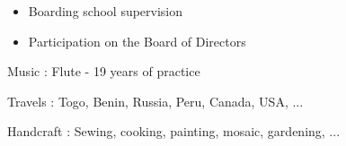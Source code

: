 \begin{itemize}
\item Boarding school supervision
\item Participation on the Board of Directors
\end{itemize}



{\color{emphasis} \faMusic \hspace{0.1cm}  Music : } 
    Flute - 19 years of practice\\
  \vspace{0.25cm}

{\color{emphasis} \faGlobe \hspace{0.1cm} Travels : }  
    Togo, Benin, Russia, Peru, Canada, USA, ...\\
  \vspace{0.25cm}
  
{\color{emphasis} \faCut  \hspace{0.1cm} Handcraft : }
    Sewing, cooking, painting, mosaic, gardening, ...

